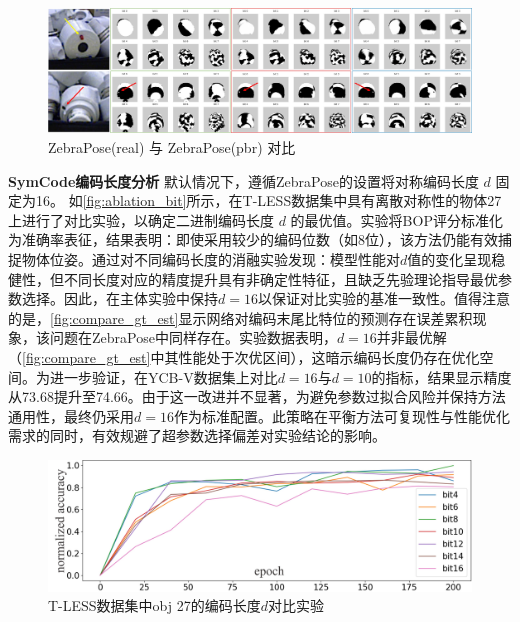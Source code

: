 \begin{figure}[ht]
        \centerline{\includegraphics[width=1.0\textwidth]{figure/symnet/vis_zebrapose_gt_real_pbr_support.jpg}}
        \caption{ZebraPose(real) 与 ZebraPose(pbr) 对比}
        \label{fig:vis_zebrapose_gt_real_pbr_support}
\end{figure}

\textbf{SymCode编码长度分析 } 默认情况下，遵循ZebraPose\cite{su2022zebrapose}的设置将对称编码长度 $d$ 固定为16。 如\autoref{fig:ablation_bit}所示，在T-LESS数据集中具有离散对称性的物体27上进行了对比实验，以确定二进制编码长度 $d$ 的最优值。实验将BOP评分标准化为准确率表征，结果表明：即使采用较少的编码位数（如8位），该方法仍能有效捕捉物体位姿。通过对不同编码长度的消融实验发现：模型性能对$d$值的变化呈现稳健性，但不同长度对应的精度提升具有非确定性特征，且缺乏先验理论指导最优参数选择。因此，在主体实验中保持$d=16$以保证对比实验的基准一致性。值得注意的是，\autoref{fig:compare_gt_est}显示网络对编码末尾比特位的预测存在误差累积现象，该问题在ZebraPose中同样存在。实验数据表明，$d=16$并非最优解（\autoref{fig:compare_gt_est}中其性能处于次优区间），这暗示编码长度仍存在优化空间。为进一步验证，在YCB-V数据集上对比$d=16$与$d=10$的指标，结果显示精度从73.68提升至74.66。由于这一改进并不显著，为避免参数过拟合风险并保持方法通用性，最终仍采用$d=16$作为标准配置。此策略在平衡方法可复现性与性能优化需求的同时，有效规避了超参数选择偏差对实验结论的影响。

\begin{figure}[ht]
        \centerline{\includegraphics[width=1.0\textwidth]{figure/symnet/ablation_bit.jpg}}
        \caption{T-LESS数据集中obj 27的编码长度$d$对比实验}
        \label{fig:ablation_bit}
\end{figure}

